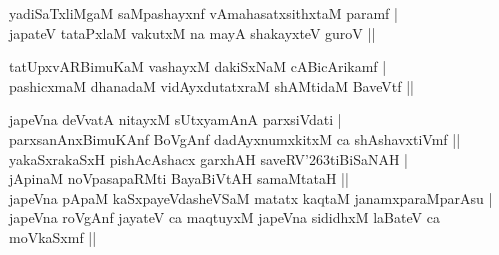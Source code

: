\begin{entry}
\begin{shl}
yadiSaTxliMgaM saMpashayxnf vAmahasatxsithxtaM paramf |\\
japateV tataPxlaM vakutxM na mayA shakayxteV guroV ||
\end{shl}
\medskip
{}
\smallskip
\begin{shl}
tatUpxvARBimuKaM vashayxM dakiSxNaM cABicArikamf |\\
pashicxmaM dhanadaM vidAyxdutatxraM shAMtidaM BaveVtf ||
\end{shl}
\medskip
{}
\smallskip
\begin{shl}
japeVna deVvatA nitayxM sUtxyamAnA parxsiVdati |\\
parxsanAnxBimuKAnf BoVgAnf dadAyxnumxkitxM ca shAshavxtiVmf ||\\
yakaSxrakaSxH pishAcAshacx garxhAH saveRV{\char'263}tiBiSaNAH |\\
jApinaM noVpasapaRMti BayaBiVtAH samaMtataH ||\\
japeVna pApaM kaSxpayeVdasheVSaM matatx kaqtaM janamxparaMparAsu |\\
japeVna roVgAnf jayateV ca maqtuyxM japeVna sididhxM laBateV ca moVkaSxmf ||
\end{shl}
\medskip
{}
\end{entry}


